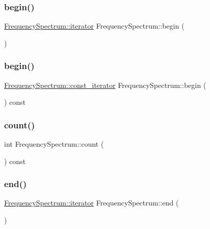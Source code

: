 \subsubsection{\texorpdfstring{begin()}{begin()}\hspace{0.1cm}{\footnotesize\ttfamily [1/2]}}
{\footnotesize\ttfamily \hyperlink{class_frequency_spectrum_a97c7fc372f25a6caef70041f07e4e1f3}{Frequency\+Spectrum\+::iterator} Frequency\+Spectrum\+::begin (\begin{DoxyParamCaption}{ }\end{DoxyParamCaption})}

\hypertarget{class_frequency_spectrum_a0c17fa4af644afc2b9555212c80db0f5}{}\label{class_frequency_spectrum_a0c17fa4af644afc2b9555212c80db0f5} 
\subsubsection{\texorpdfstring{begin()}{begin()}\hspace{0.1cm}{\footnotesize\ttfamily [2/2]}}
{\footnotesize\ttfamily \hyperlink{class_frequency_spectrum_a7dee82b74b040880feb5a0de2d7ab66b}{Frequency\+Spectrum\+::const\+\_\+iterator} Frequency\+Spectrum\+::begin (\begin{DoxyParamCaption}{ }\end{DoxyParamCaption}) const}

\hypertarget{class_frequency_spectrum_a23f805be34e28075fe7e720a71f69b7d}{}\label{class_frequency_spectrum_a23f805be34e28075fe7e720a71f69b7d} 
\subsubsection{\texorpdfstring{count()}{count()}}
{\footnotesize\ttfamily int Frequency\+Spectrum\+::count (\begin{DoxyParamCaption}{ }\end{DoxyParamCaption}) const}

\hypertarget{class_frequency_spectrum_aa141310e65ac810ffb006e082658dbbe}{}\label{class_frequency_spectrum_aa141310e65ac810ffb006e082658dbbe} 
\subsubsection{\texorpdfstring{end()}{end()}\hspace{0.1cm}{\footnotesize\ttfamily [1/2]}}
{\footnotesize\ttfamily \hyperlink{class_frequency_spectrum_a97c7fc372f25a6caef70041f07e4e1f3}{Frequency\+Spectrum\+::iterator} Frequency\+Spectrum\+::end (\begin{DoxyParamCaption}{ }\end{DoxyParamCaption})}


